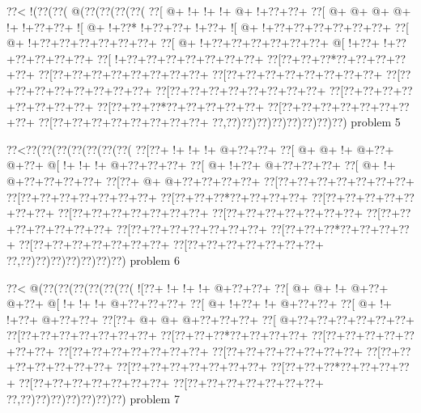 \vbox{\vbox{\goo
\0??<\- !(\0??(\0??(\- @(\0??(\0??(\0??(\0??(
\0??[\- @+\- !+\- !+\- !+\- @+\- !+\0??+\0??+
\0??[\- @+\- @+\- @+\- @+\- !+\- !+\0??+\0??+
\- ![\- @+\- !+\0??*\- !+\0??+\0??+\- !+\0??+
\- ![\- @+\- !+\0??+\0??+\0??+\0??+\0??+\0??+
\0??[\- @+\- !+\0??+\0??+\0??+\0??+\0??+\0??+
\0??[\- @+\- !+\0??+\0??+\0??+\0??+\0??+\0??+
\- @[\- !+\0??+\- !+\0??+\0??+\0??+\0??+\0??+
\0??[\- !+\0??+\0??+\0??+\0??+\0??+\0??+\0??+
\0??[\0??+\0??+\0??*\0??+\0??+\0??+\0??+\0??+
\0??[\0??+\0??+\0??+\0??+\0??+\0??+\0??+\0??+
\0??[\0??+\0??+\0??+\0??+\0??+\0??+\0??+\0??+
\0??[\0??+\0??+\0??+\0??+\0??+\0??+\0??+\0??+
\0??[\0??+\0??+\0??+\0??+\0??+\0??+\0??+\0??+
\0??[\0??+\0??+\0??+\0??+\0??+\0??+\0??+\0??+
\0??[\0??+\0??+\0??*\0??+\0??+\0??+\0??+\0??+
\0??[\0??+\0??+\0??+\0??+\0??+\0??+\0??+\0??+
\0??[\0??+\0??+\0??+\0??+\0??+\0??+\0??+\0??+
\0??,\0??)\0??)\0??)\0??)\0??)\0??)\0??)\0??)
}
\hfil problem 5\hfil\break
}

\vbox{\vbox{\goo
\0??<\0??(\0??(\0??(\0??(\0??(\0??(\0??(
\0??[\0??+\- !+\- !+\- !+\- @+\0??+\0??+
\0??[\- @+\- @+\- !+\- @+\0??+\- @+\0??+
\- @[\- !+\- !+\- !+\- @+\0??+\0??+\0??+
\0??[\- @+\- !+\0??+\- @+\0??+\0??+\0??+
\0??[\- @+\- !+\- @+\0??+\0??+\0??+\0??+
\0??[\0??+\- @+\- @+\0??+\0??+\0??+\0??+
\0??[\0??+\0??+\0??+\0??+\0??+\0??+\0??+
\0??[\0??+\0??+\0??+\0??+\0??+\0??+\0??+
\0??[\0??+\0??+\0??*\0??+\0??+\0??+\0??+
\0??[\0??+\0??+\0??+\0??+\0??+\0??+\0??+
\0??[\0??+\0??+\0??+\0??+\0??+\0??+\0??+
\0??[\0??+\0??+\0??+\0??+\0??+\0??+\0??+
\0??[\0??+\0??+\0??+\0??+\0??+\0??+\0??+
\0??[\0??+\0??+\0??+\0??+\0??+\0??+\0??+
\0??[\0??+\0??+\0??*\0??+\0??+\0??+\0??+
\0??[\0??+\0??+\0??+\0??+\0??+\0??+\0??+
\0??[\0??+\0??+\0??+\0??+\0??+\0??+\0??+
\0??,\0??)\0??)\0??)\0??)\0??)\0??)\0??)
}
\hfil problem 6\hfil\break
}

\vbox{\vbox{\goo
\0??<\- @(\0??(\0??(\0??(\0??(\0??(\0??(
\- ![\0??+\- !+\- !+\- !+\- @+\0??+\0??+
\0??[\- @+\- @+\- !+\- @+\0??+\- @+\0??+
\- @[\- !+\- !+\- !+\- @+\0??+\0??+\0??+
\0??[\- @+\- !+\0??+\- !+\- @+\0??+\0??+
\0??[\- @+\- !+\- !+\0??+\- @+\0??+\0??+
\0??[\0??+\- @+\- @+\- @+\0??+\0??+\0??+
\0??[\- @+\0??+\0??+\0??+\0??+\0??+\0??+
\0??[\0??+\0??+\0??+\0??+\0??+\0??+\0??+
\0??[\0??+\0??+\0??*\0??+\0??+\0??+\0??+
\0??[\0??+\0??+\0??+\0??+\0??+\0??+\0??+
\0??[\0??+\0??+\0??+\0??+\0??+\0??+\0??+
\0??[\0??+\0??+\0??+\0??+\0??+\0??+\0??+
\0??[\0??+\0??+\0??+\0??+\0??+\0??+\0??+
\0??[\0??+\0??+\0??+\0??+\0??+\0??+\0??+
\0??[\0??+\0??+\0??*\0??+\0??+\0??+\0??+
\0??[\0??+\0??+\0??+\0??+\0??+\0??+\0??+
\0??[\0??+\0??+\0??+\0??+\0??+\0??+\0??+
\0??,\0??)\0??)\0??)\0??)\0??)\0??)\0??)
}
\hfil problem 7\hfil\break
}

